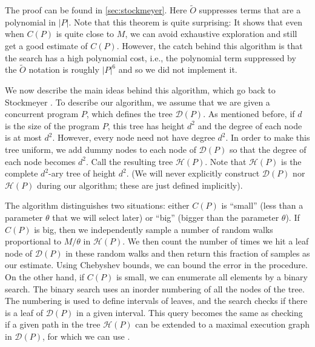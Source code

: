 The proof can be found in \cref{sec:stockmeyer}.
Here $\tilde{O}$ suppresses terms that are a polynomial in $|P|$. Note that this theorem is quite surprising: 
It shows that even when $C(P)$ is quite close to $M$, we can avoid exhaustive exploration and still get a good estimate of $C(P)$. 
However, the catch behind this algorithm is that the search has a high polynomial cost, i.e., the polynomial term suppressed by the $\tilde{O}$ notation is roughly $|P|^6$ and so we did not implement it.

We now describe the main ideas behind this algorithm, which go back to Stockmeyer \cite{Stockmeyer85}.
To describe our algorithm, we assume that we are given a concurrent program $P$, 
which defines the tree $\mathcal{D}(P)$. 
As mentioned before, if $d$ is the size of the program $P$, 
this tree has height $d^2$ and the degree of each node is at most $d^2$. 
However, every node need not have degree $d^2$. In order to make this tree uniform, we add dummy nodes to each node of $\mathcal{D}(P)$ so that the degree of each node becomes $d^2$. 
Call the resulting tree $\mathcal{H}(P)$. Note that $\mathcal{H}(P)$ 
is the complete $d^2$-ary tree of height $d^2$. 
(We will never explicitly construct $\mathcal{D}(P)$ nor $\mathcal{H}(P)$ during our algorithm; 
these are just defined implicitly). 

The algorithm distinguishes two situations: either $C(P)$ is ``small'' (less than a parameter $\theta$ that we will select later)
or ``big'' (bigger than the parameter $\theta$).
If $C(P)$ is big, then we independently sample a number of random walks proportional to $M/\theta$ in $\mathcal{H}(P)$.
We then count the number of times we hit a leaf node of $\mathcal{D}(P)$ in these random walks and then return this fraction of samples as our estimate.
Using Chebyshev bounds, we can bound the error in the procedure.
On the other hand, if $C(P)$ is small, we can enumerate all elements by a binary search.
The binary search uses an inorder numbering of all the nodes of the tree.
The numbering is used to define intervals of leaves, and the search checks if there is a leaf of $\mathcal{D}(P)$ in a given interval.
This query becomes the same as checking if a given path in the tree $\mathcal{H}(P)$ can be extended to a maximal execution graph in $\mathcal{D}(P)$, for which we can use \trust.

